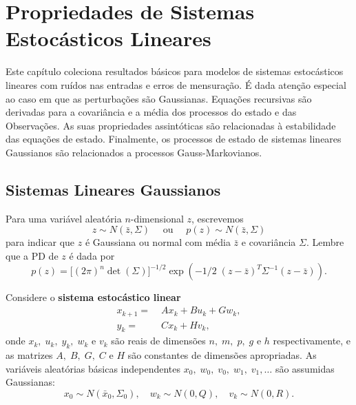 





\chapter{Propriedades de Sistemas
 Estocásticos Lineares}
Este capítulo coleciona resultados básicos para modelos de sistemas estocásticos lineares com ruídos nas entradas e erros de mensuração. É dada atenção especial ao caso em que as perturbações são Gaussianas. Equações recursivas são derivadas para a covariância e a média dos processos do estado e das Observações. As suas propriedades assintóticas são relacionadas à estabilidade das equações de estado. Finalmente, os processos de estado de sistemas lineares Gaussianos são relacionados a processos Gauss-Markovianos.




\section{Sistemas Lineares Gaussianos}
Para uma variável aleatória $n$-dimensional $z$, escrevemos
\begin{equation}\label{3.1.1}
	z \sim N(\bar z, \Sigma) \quad
	\text{ ou }\quad p(z) \sim N(\bar z,
	\Sigma)
\end{equation}
para indicar que $z$ é Gaussiana ou normal com média $\bar z$ e covariância $\Sigma$. Lembre que a PD de $z$ é dada por
\begin{equation}\label{3.1.2}
	p(z)=\Big[(2\pi)^n \det(\Sigma)
	\Big]^{-1/2}\exp\left(-1/2\;
	(z-\bar z)^T\Sigma^{-1}(z-\bar z)\right).
\end{equation}

Considere o {\bf sistema estocástico linear}
\begin{subequations}\label{3.1.3}
	\begin{align}
	 x_{k+1}= &\; Ax_k+Bu_k+Gw_k,
	 \label{3.1.3a}\\
	y_k =&\; Cx_k + Hv_k,
	\label{3.1.3b}
	\end{align}
\end{subequations}
onde $x_k,\;u_k,\;y_k,\;w_k$ e $v_k$ são reais de dimensões $n,\;m,\;p,\;g$ e $h$ respectivamente, e as matrizes $A,\;B,\;G,\;C$
e $H$ são constantes de dimensões apropriadas.
As variáveis aleatórias básicas independentes $x_0,\; w_0,\; v_0,\; w_1,\;v_1,\dots$ são assumidas Gaussianas:
\begin{equation}\label{3.1.4}
	x_0\sim N(\bar x_0,\Sigma_0),
	\quad w_k\sim N(0,Q),
	\quad v_k\sim N(0,R).
\end{equation}

